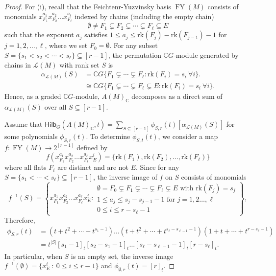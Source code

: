 \documentclass[10pt,a4paper]{amsart}
\newcommand{\FY}{\operatorname{FY}}
\newcommand{\Hilb}{{\mathsf{Hilb}}}
\renewcommand{\L}{{\mathcal{L}}}
\newcommand{\rk}{{\mathrm{rk}}}
\begin{document}
\begin{proof}
For (i), recall that the Feichtenr-Yuzvinsky basis $\FY(M)$ consists of monomials $x_{F_1}^{a_1}x_{F_2}^{a_2}\ldots x_{F_{\ell}}^{a_{\ell}}$ indexed by chains (including the empty chain)
\[
    \emptyset\neq F_1\subsetneq F_2\subsetneq\cdots\subsetneq F_{\ell}\subseteq{E}
\]
such that the exponent $a_j$ satisfies $1\le a_j\le \rk(F_j)-\rk(F_{j-1})-1$ for $j=1,2,\ldots,\ell$, where we set $F_0=\emptyset$.
For any subset $S=\{s_1<s_2<\cdots<s_{\ell}\}\subseteq [r-1]$, the permutation $\mathbb{C}G$-module generated by chains in $\L(M)$ with rank set $S$ is
\begin{align*}
    \alpha_{\L(M)}(S)
    &=\mathbb{C}G\{F_1\subsetneq \cdots\subsetneq F_{\ell}: \rk(F_i)=s_i~\forall i\}.\\
    &\cong \mathbb{C}G\{F_1\subsetneq \cdots\subsetneq F_{\ell}\subsetneq E: \rk(F_i)=s_i~\forall i\}.
\end{align*}
Hence, as a graded $\mathbb{C}G$-module, $A(M)_{\mathbb{C}}$ decomposes as a direct sum of $\alpha_{\L(M)}(S)$ over all $S\subseteq [r-1]$.

Assume that $
    \Hilb_G(A(M)_{\mathbb{C}},t)=\sum_{S\subseteq [r-1]}\phi_{S,r}(t)[\alpha_{\L(M)}(S)]$
for some polynomials $\phi_{S,r}(t)$. To determine $\phi_{S,t}(t)$, we consider a map $f:\FY(M)\longrightarrow 2^{[r-1]}$ defined by 
\[
    f(x_{F_1}^{a_1}x_{F_2}^{a_2}\ldots x_{F_{\ell}}^{a_{\ell}}x_E^i)=\{\rk(F_1),\rk(F_2),\ldots,\rk(F_{\ell})\}
\]
where all flats $F_i$ are distinct and are not $E$. Since for any $S=\{s_1<\cdots<s_{\ell}\}\subseteq [r-1]$, the inverse image of $f$ on $S$ consists of monomials
\[
    f^{-1}(S)=\left\{x_{F_1}^{a_1}x_{F_2}^{a_2}\ldots x_{F_{\ell}}^{a_{\ell}}x_E^i : \substack{\emptyset=F_0\subsetneq F_1\subsetneq\cdots\subsetneq F_{\ell}\subsetneq E \text{ with }\rk(F_j)=s_j\\
    1\le a_j\le s_j-s_{j-1}-1  \text{ for }j=1,2\ldots,\ell\\
    0\le i\le r-s_{\ell}-1
    }\right\},
\]
Therefore,
\begin{align*}
    \phi_{S,r}(t)
    &=(t+t^2+\cdots+t^{s_1-1})\ldots(t+t^2+\cdots+t^{s_{\ell}-s_{\ell-1}-1})(1+t+\cdots+t^{r-s_{\ell}-1})\\
    &=t^{|S|}[s_1-1]_t[s_2-s_1-1]_t\ldots[s_{\ell}-s_{\ell-1}-1]_t[r-s_{\ell}]_t.
\end{align*}
In particular, when $S$ is an empty set, the inverse image $f^{-1}(\emptyset)=\{x_E^i~:~0\le i\le r-1\}$ and $\phi_{\emptyset,r}(t)=[r]_t$.


\end{proof}
\end{document}
